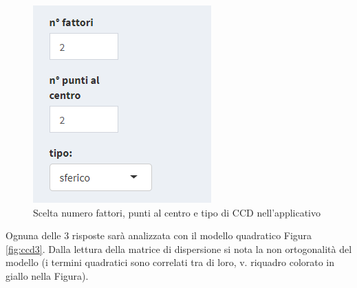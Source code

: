 \documentclass[
  11pt,
]{book}
\begin{document}
\begin{figure}[ht]

{\centering \includegraphics[width=1\linewidth]{Immagini/CCD/02_disegno_esempio} 

}

\caption{Scelta numero fattori, punti al centro e tipo di CCD nell'applicativo}\label{fig:ccd2}
\end{figure}

Ognuna delle 3 risposte sarà analizzata con il modello quadratico Figura \ref{fig:ccd3}. Dalla lettura della matrice di dispersione si nota la non ortogonalità del modello (i termini quadratici sono correlati tra di loro, v. riquadro colorato in giallo nella Figura).
\end{document}
